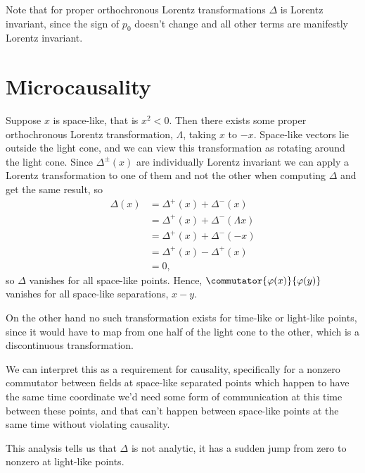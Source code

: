 \documentclass[fleqn]{NotesClass}
\begin{document}
    Note that for proper orthochronous Lorentz transformations \(\Delta\) is Lorentz invariant, since the sign of \(p_0\) doesn't change and all other terms are manifestly Lorentz invariant.
    
    \section{Microcausality}
    Suppose \(x\) is space-like, that is \(x^2 < 0\).
    Then there exists some proper orthochronous Lorentz transformation, \(\Lambda\), taking \(x\) to \(-x\).
    Space-like vectors lie outside the light cone, and we can view this transformation as rotating around the light cone.
    Since \(\Delta^{\pm}(x)\) are individually Lorentz invariant we can apply a Lorentz transformation to one of them and not the other when computing \(\Delta\) and get the same result, so
    \begin{align}
        \Delta(x) &= \Delta^+(x) + \Delta^-(x)\\
        &= \Delta^+(x) + \Delta^-(\Lambda x)\\
        &= \Delta^+(x) + \Delta^-(-x)\\
        &= \Delta^+(x) - \Delta^+(x)\\
        &= 0,
    \end{align}
    so \(\Delta\) vanishes for all space-like points.
    Hence, \(\commutator{\varphi(x)}{\varphi(y)}\) vanishes for all space-like separations, \(x - y\).
    
    On the other hand no such transformation exists for time-like or light-like points, since it would have to map from one half of the light cone to the other, which is a discontinuous transformation.
    
    We can interpret this as a requirement for causality, specifically for a nonzero commutator between fields at space-like separated points which happen to have the same time coordinate we'd need some form of communication at this time between these points, and that can't happen between space-like points at the same time without violating causality.
    
    This analysis tells us that \(\Delta\) is not analytic, it has a sudden jump from zero to nonzero at light-like points.
    
\end{document}
